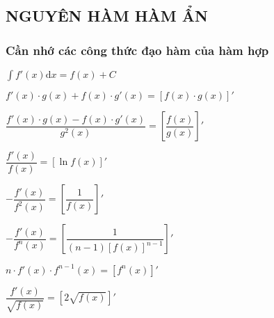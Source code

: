 \newpage
\subsection{NGUYÊN HÀM HÀM ẨN}

\subsubsection*{Cần nhớ các công thức đạo hàm của hàm hợp}
\begin{listEX}[2]%
	\item $\int{f'(x)\mathrm{d}x}=f(x)+C$
	\item $f'(x)\cdot g(x)+f(x)\cdot g'(x)=\left[f(x)\cdot g(x)\right]'$
	\item $\dfrac{f'(x)\cdot g(x)-f(x)\cdot g'(x)}{g^2(x)} =\left[\dfrac{f(x)}{g(x)}\right]'$
	\item $\dfrac{f'(x)}{f(x)}=\left[\ln f(x) \right]'$
	\item $-\dfrac{f'(x)}{f^2(x)}=\left[ \dfrac{1}{f(x)} \right]'$
	\item $-\dfrac{f'(x)}{f^n(x)}=\left[ \dfrac{1}{(n-1)\left[ f(x) \right]^{n-1}} \right]'$
	\item $n\cdot f'(x)\cdot f^{n-1}(x)=\left[ f^n(x) \right]'$
	\item $\dfrac{f'(x)}{\sqrt{f(x)}}=\left[ 2\sqrt{f(x)} \right]'$
\end{listEX}

